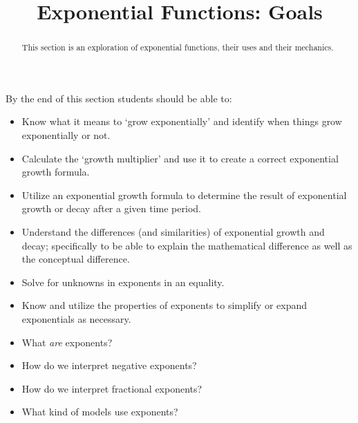 \documentclass{ximeraXloud}
\title{Exponential Functions: Goals}
\begin{document}
\begin{abstract}
This section is an exploration of exponential functions, their uses and their mechanics.
\end{abstract}
\maketitle
By the end of this section students should be able to:

\begin{itemize}
    \item Know what it means to `grow exponentially' and identify when things grow exponentially or not.
    \item Calculate the `growth multiplier' and use it to create a correct exponential growth formula.
    \item Utilize an exponential growth formula to determine the result of exponential growth or decay after a given time period.
    \item Understand the differences (and similarities) of exponential growth and decay; specifically to be able to explain the mathematical difference as well as the conceptual difference.
    \item Solve for unknowns in exponents in an equality.
    \item Know and utilize the properties of exponents to simplify or expand exponentials as necessary.
\end{itemize}

\begin{itemize}
    \item What \textit{are} exponents?
    \item How do we interpret negative exponents?
    \item How do we interpret fractional exponents?
    \item What kind of models use exponents?
\end{itemize}
\end{document}
